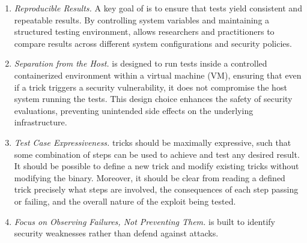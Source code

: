 \begin{enumerate}
  \item \label{dg:repro}\textit{Reproducible Results.} A key goal of \houdini is to ensure that tests yield consistent and repeatable results. By controlling system variables and maintaining a structured testing environment, \houdini allows researchers and practitioners to compare results across different system configurations and security policies.

  \item \label{dg:container}\textit{Separation from the Host.} \houdini is designed to run tests inside a controlled containerized environment within a virtual machine (VM), ensuring that even if a trick triggers a security vulnerability, it does not compromise the host system running the tests. This design choice enhances the safety of security evaluations, preventing unintended side effects on the underlying infrastructure.

  \item \label{dg:test}\textit{Test Case Expressiveness.} \houdini tricks should be maximally expressive, such that some combination of steps can be used to achieve and test any desired result. It should be possible to define a new \houdini trick and modify existing tricks without modifying the \houdini binary. Moreover, it should be clear from reading a defined trick precisely what steps are involved, the consequences of each step passing or failing, and the overall nature of the exploit being tested.

  \item \label{dg:failures}\textit{Focus on Observing Failures, Not Preventing Them.} \houdini is built to identify security weaknesses rather than defend against attacks.
\end{enumerate}
